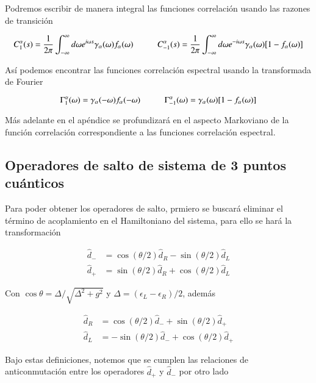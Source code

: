 \begin{appendixs}
Podremos escribir de manera integral las funciones correlación usando las razones de transición

\begin{equation*}
    C_{1}^{\alpha}(s) = \frac{1}{2\pi} \int_{-\infty}^{\infty}d\omega e^{i\omega s} \gamma_{\alpha}(\omega) f_{\alpha}(\omega)  \hspace{10mm} C_{-1}^{\alpha}(s) = \frac{1}{2\pi} \int_{-\infty}^{\infty}d\omega e^{-i\omega s} \gamma_{\alpha}(\omega) [1-f_{\alpha}(\omega)]
\end{equation*}

Así podemos encontrar las funciones correlación espectral usando la transformada de Fourier

\begin{equation*}
    \Gamma_{1}^{\alpha}(\omega) = \gamma_{\alpha}(-\omega)f_{\alpha}(-\omega)  \hspace{10mm} \Gamma_{-1}^{\alpha}(\omega) = \gamma_{\alpha}(\omega)[1-f_{\alpha}(\omega)]
\end{equation*}

Más adelante en el apéndice se profundizará en el aspecto Markoviano de la función correlación correspondiente a las funciones correlación espectral.
\label{apendix5bathcorre}

\subsection{ Operadores de salto de sistema de 3 puntos cuánticos}
Para poder obtener los operadores de salto, prmiero se buscará eliminar el término de acoplamiento en el Hamiltoniano del sistema, para ello se hará la transformación

\begin{align*}
    \hat{d}_{-} & = \cos(\theta/2)\hat{d}_{R} - \sin(\theta/2)\hat{d}_{L} \\
    \hat{d}_{+} & = \sin(\theta/2)\hat{d}_{R} + \cos(\theta/2)\hat{d}_{L}
\end{align*}


Con $\cos \theta = \Delta/\sqrt{ \Delta^{2} + g^{2} }$ y $\Delta = (\epsilon_{L} - \epsilon_{R})/2$, además  

\begin{align*}
    \hat{d}_{R} & = \cos(\theta/2)\hat{d}_{-} + \sin(\theta/2)\hat{d}_{+} \\
    \hat{d}_{L} & = -\sin(\theta/2)\hat{d}_{-} + \cos(\theta/2)\hat{d}_{+}
\end{align*}

Bajo estas definiciones, notemos que se cumplen las relaciones de anticonmutación entre los operadores $\hat{d}_{+}$ y $\hat{d}_{-}$ por otro lado


\end{appendixs}
